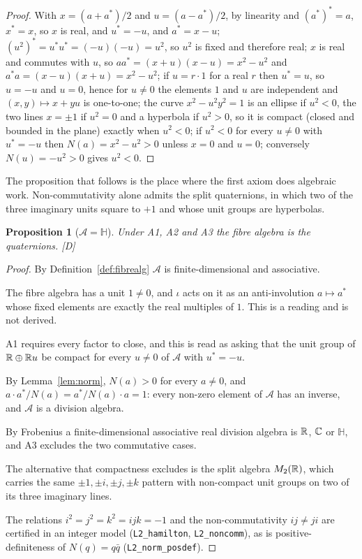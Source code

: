 \documentclass[11pt,a4paper]{article}
\theoremstyle{plain}
\newtheorem{proposition}[theorem]{Proposition}
\theoremstyle{definition}
\theoremstyle{remark}
\newcommand{\Hquat}{\mathbb{H}}
\newcommand{\rigD}{[\textup{D}]}
\begin{document}
\begin{proof}
With $x=(a+a^{*})/2$ and $u=(a-a^{*})/2$, by linearity and $(a^{*})^{*}=a$, $x^{*}=x$, so $x$ is real, and $u^{*}=-u$, and $a^{*}=x-u$; $(u^{2})^{*}=u^{*}u^{*}=(-u)(-u)=u^{2}$, so $u^{2}$ is fixed and therefore real; $x$ is real and commutes with $u$, so $aa^{*}=(x+u)(x-u)=x^{2}-u^{2}$ and $a^{*}a=(x-u)(x+u)=x^{2}-u^{2}$; if $u=r\cdot1$ for a real $r$ then $u^{*}=u$, so $u=-u$ and $u=0$, hence for $u\neq0$ the elements $1$ and $u$ are independent and $(x,y)\mapsto x+yu$ is one-to-one; the curve $x^{2}-u^{2}y^{2}=1$ is an ellipse if $u^{2}<0$, the two lines $x=\pm1$ if $u^{2}=0$ and a hyperbola if $u^{2}>0$, so it is compact (closed and bounded in the plane) exactly when $u^{2}<0$; if $u^{2}<0$ for every $u\neq0$ with $u^{*}=-u$ then $N(a)=x^{2}-u^{2}>0$ unless $x=0$ and $u=0$; conversely $N(u)=-u^{2}>0$ gives $u^{2}<0$.
\end{proof}

The proposition that follows is the place where the first axiom does algebraic work. Non-commutativity alone admits the split quaternions, in which two of the three imaginary units square to $+1$ and whose unit groups are hyperbolas.

\begin{proposition}[$\mathcal{A}=\Hquat$]\label{prop:H}
Under A1, A2 and A3 the fibre algebra is the quaternions. \rigD
\end{proposition}

\begin{proof}
By Definition~\ref{def:fibrealg} $\mathcal{A}$ is finite-dimensional and associative.

The fibre algebra has a unit $1\neq0$, and $\iota$ acts on it as an anti-involution $a\mapsto a^{*}$ whose fixed elements are exactly the real multiples of $1$. This is a reading and is not derived.

A1 requires every factor to close, and this is read as asking that the unit group of $\mathbb{R}\oplus\mathbb{R} u$ be compact for every $u\neq0$ of $\mathcal{A}$ with $u^{*}=-u$.

By Lemma~\ref{lem:norm}, $N(a)>0$ for every $a\neq0$, and $a\cdot a^{*}/N(a)=a^{*}/N(a)\cdot a=1$: every non-zero element of $\mathcal{A}$ has an inverse, and $\mathcal{A}$ is a division algebra.

By Frobenius \cite{Frobenius1878} a finite-dimensional associative real division algebra is $\mathbb{R}$, $\mathbb{C}$ or $\Hquat$, and A3 excludes the two commutative cases.

The alternative that compactness excludes is the split algebra $M_{2}(\mathbb{R})$, which carries the same $\pm1,\pm i,\pm j,\pm k$ pattern with non-compact unit groups on two of its three imaginary lines.

The relations $i^{2}=j^{2}=k^{2}=ijk=-1$ and the non-commutativity $ij\neq ji$ are certified in an integer model (\texttt{L2\_hamilton}, \texttt{L2\_noncomm}), as is positive-definiteness of $N(q)=q\bar q$ (\texttt{L2\_norm\_posdef}).
\end{proof}
\end{document}
